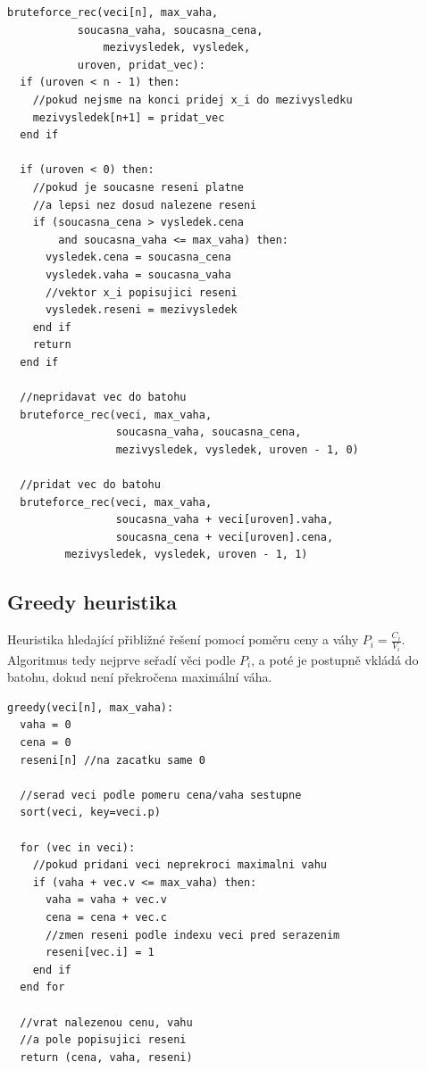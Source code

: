 \documentclass[11pt]{article}
\begin{document}
\begin{lstlisting}
bruteforce_rec(veci[n], max_vaha, 
	       soucasna_vaha, soucasna_cena, 
               mezivysledek, vysledek,
	       uroven, pridat_vec):
  if (uroven < n - 1) then:
    //pokud nejsme na konci pridej x_i do mezivysledku
    mezivysledek[n+1] = pridat_vec
  end if

  if (uroven < 0) then:
    //pokud je soucasne reseni platne 
    //a lepsi nez dosud nalezene reseni
    if (soucasna_cena > vysledek.cena 
        and soucasna_vaha <= max_vaha) then:
      vysledek.cena = soucasna_cena
      vysledek.vaha = soucasna_vaha
      //vektor x_i popisujici reseni
      vysledek.reseni = mezivysledek
    end if
    return
  end if

  //nepridavat vec do batohu
  bruteforce_rec(veci, max_vaha, 
                 soucasna_vaha, soucasna_cena, 
                 mezivysledek, vysledek, uroven - 1, 0)

  //pridat vec do batohu
  bruteforce_rec(veci, max_vaha, 
                 soucasna_vaha + veci[uroven].vaha,
                 soucasna_cena + veci[uroven].cena,
		 mezivysledek, vysledek, uroven - 1, 1)

\end{lstlisting}

\subsection{Greedy heuristika}

Heuristika hledající přibližné řešení pomocí poměru ceny a váhy $P_i=\frac{C_i}{V_i}$. Algoritmus tedy nejprve seřadí věci podle $P_i$, a poté je postupně vkládá do batohu, dokud není překročena maximální váha.

\begin{lstlisting}
greedy(veci[n], max_vaha):
  vaha = 0 
  cena = 0
  reseni[n] //na zacatku same 0

  //serad veci podle pomeru cena/vaha sestupne
  sort(veci, key=veci.p) 

  for (vec in veci):
    //pokud pridani veci neprekroci maximalni vahu
    if (vaha + vec.v <= max_vaha) then:
      vaha = vaha + vec.v
      cena = cena + vec.c
      //zmen reseni podle indexu veci pred serazenim
      reseni[vec.i] = 1
    end if
  end for

  //vrat nalezenou cenu, vahu
  //a pole popisujici reseni
  return (cena, vaha, reseni)

\end{lstlisting}
\end{document}
